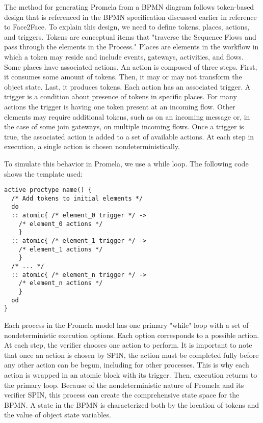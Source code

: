 The method for generating Promela from a BPMN diagram follows token-based design that is referenced in the BPMN specification \cite{BPMNSpecification} discussed earlier in reference to Face2Face. To explain this design, we need to define tokens, places, actions, and triggers. Tokens are conceptual items that "traverse the Sequence Flows and pass through the elements in the Process." \cite{BPMNSpecification} Places are elements in the workflow in which a token may reside and include events, gateways, activities, and flows. Some places have associated actions. An action is composed of three steps. First, it consumes some amount of tokens. Then, it may or may not transform the object state. Last, it produces tokens. Each action has an associated trigger. A trigger is a condition about presence of tokens in specific places. For many actions the trigger is having one token present at an incoming flow. Other elements may require additional tokens, such as on an incoming message or, in the case of some join gateways, on multiple incoming flows. Once a trigger is true, the associated action is added to a set of available actions. At each step in execution, a single action is chosen nondeterministically.

To simulate this behavior in Promela, we use a while loop. The following code shows the template used: 

\begin{lstlisting}[style=myPromela]
active proctype name() {
  /* Add tokens to initial elements */
  do
  :: atomic{ /* element_0 trigger */ ->
    /* element_0 actions */
    }
  :: atomic{ /* element_1 trigger */ ->
    /* element_1 actions */
    }
  /* ... */  
  :: atomic{ /* element_n trigger */ ->
    /* element_n actions */
    }
  od
}
\end{lstlisting}


Each process in the Promela model has one primary "while" loop with a set of nondeterministic execution options. Each option corresponds to a possible action. At each step, the verifier chooses one action to perform. It is important to note that once an action is chosen by SPIN, the action must be completed fully before any other action can be begun, including for other processes. This is why each action is wrapped in an atomic block with its trigger. Then, execution returns to the primary loop. Because of the nondeterministic nature of Promela and its verifier SPIN, this process can create the comprehensive state space for the BPMN. A state in the BPMN is characterized both by the location of tokens and the value of object state variables.

